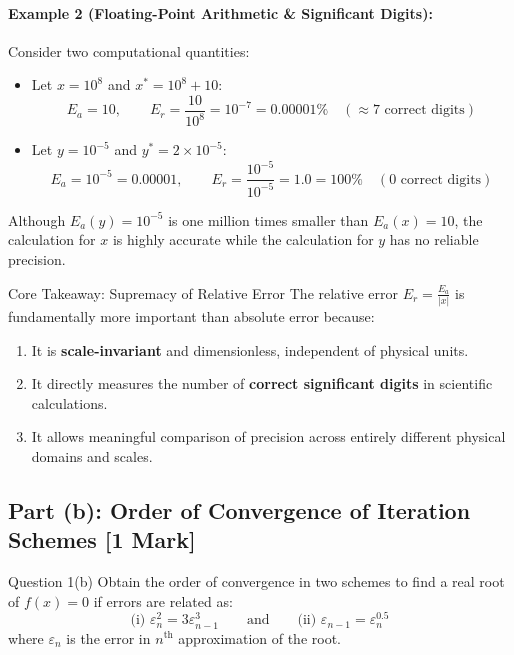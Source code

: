 \documentclass[11pt,a4paper]{article}
\newcommand{\abs}[1]{\left\lvert#1\right\rvert}
\begin{document}
\paragraph{Example 2 (Floating-Point Arithmetic \& Significant Digits):}
Consider two computational quantities:
\begin{itemize}[leftmargin=*]
    \item Let $x = 10^8$ and $x^* = 10^8 + 10$:
    \[
    E_a = 10, \qquad E_r = \frac{10}{10^8} = 10^{-7} = 0.00001\% \quad (\approx 7\text{ correct digits})
    \]
    \item Let $y = 10^{-5}$ and $y^* = 2 \times 10^{-5}$:
    \[
    E_a = 10^{-5} = 0.00001, \qquad E_r = \frac{10^{-5}}{10^{-5}} = 1.0 = 100\% \quad (0\text{ correct digits})
    \]
\end{itemize}
Although $E_a(y) = 10^{-5}$ is one million times smaller than $E_a(x) = 10$, the calculation for $x$ is highly accurate while the calculation for $y$ has no reliable precision.

\begin{answerbox}{Core Takeaway: Supremacy of Relative Error}
The relative error $E_r = \frac{E_a}{\abs{x}}$ is fundamentally more important than absolute error because:
\begin{enumerate}[leftmargin=*]
    \item It is \textbf{scale-invariant} and dimensionless, independent of physical units.
    \item It directly measures the number of \textbf{correct significant digits} in scientific calculations.
    \item It allows meaningful comparison of precision across entirely different physical domains and scales.
\end{enumerate}
\end{answerbox}

\vspace{10pt}

\subsection*{Part (b): Order of Convergence of Iteration Schemes \hfill \normalsize\normalfont\color{darkgray}[1 Mark]}

\begin{questionbox}{Question 1(b)}
Obtain the order of convergence in two schemes to find a real root of $f(x) = 0$ if errors are related as:
\[
\text{(i) } \varepsilon_n^2 = 3\varepsilon_{n-1}^3 \qquad \text{and} \qquad \text{(ii) } \varepsilon_{n-1} = \varepsilon_n^{0.5}
\]
where $\varepsilon_n$ is the error in $n^{\text{th}}$ approximation of the root.
\end{questionbox}
\end{document}

